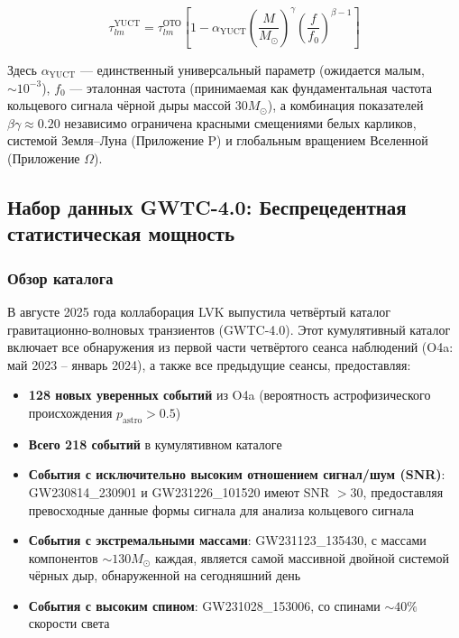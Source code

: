 \documentclass[12pt,a4paper]{article}
\theoremstyle{remark}
\begin{document}
	\begin{equation}
		\tau_{lm}^{\text{YUCT}} = \tau_{lm}^{\text{ОТО}} \left[ 1 - \alpha_{\text{YUCT}} \left( \frac{M}{M_\odot} \right)^{\gamma} \left( \frac{f}{f_0} \right)^{\beta-1} \right]
		\label{eq:tau-mod}
	\end{equation}
	
	Здесь $\alpha_{\text{YUCT}}$ — единственный универсальный параметр (ожидается малым, $\sim 10^{-3}$), $f_0$ — эталонная частота (принимаемая как фундаментальная частота кольцевого сигнала чёрной дыры массой $30 M_\odot$), а комбинация показателей $\beta\gamma \approx 0.20$ независимо ограничена красными смещениями белых карликов, системой Земля–Луна (Приложение P) и глобальным вращением Вселенной (Приложение $\Omega$).
	
	\subsection{Набор данных GWTC-4.0: Беспрецедентная статистическая мощность}
	
	\subsubsection{Обзор каталога}
	
	В августе 2025 года коллаборация LVK выпустила четвёртый каталог гравитационно-волновых транзиентов (GWTC-4.0). Этот кумулятивный каталог включает все обнаружения из первой части четвёртого сеанса наблюдений (O4a: май 2023 – январь 2024), а также все предыдущие сеансы, предоставляя:
	
	\begin{itemize}
		\item \textbf{128 новых уверенных событий} из O4a (вероятность астрофизического происхождения $p_{\text{astro}} > 0.5$)
		\item \textbf{Всего 218 событий} в кумулятивном каталоге
		\item \textbf{События с исключительно высоким отношением сигнал/шум (SNR)}: GW230814\_230901 и GW231226\_101520 имеют SNR $> 30$, предоставляя превосходные данные формы сигнала для анализа кольцевого сигнала
		\item \textbf{События с экстремальными массами}: GW231123\_135430, с массами компонентов $\sim 130 M_\odot$ каждая, является самой массивной двойной системой чёрных дыр, обнаруженной на сегодняшний день
		\item \textbf{События с высоким спином}: GW231028\_153006, со спинами $\sim 40\%$ скорости света
	\end{itemize}
	
\end{document}
